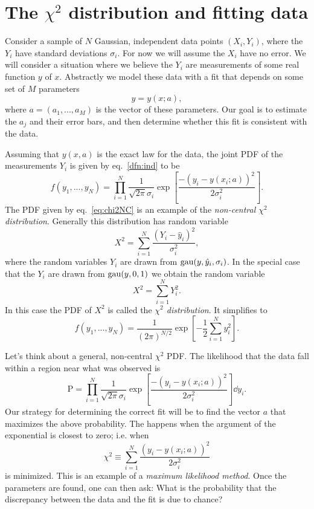 \section{The $\chi^2$ distribution and fitting data}
Consider a sample of $N$ Gaussian, independent data points $(X_i,Y_i)$,
where the $Y_i$ have standard deviations $\sigma_i$. For now we will
assume the $X_i$ have no error. We will consider a situation where
we believe the $Y_i$ are measurements of some real function $y$ of $x$.
Abstractly we model these data with a fit that depends on some set
of $M$ parameters
\begin{equation}
  y=y(x;a),
\end{equation}
where $a=(a_1,...,a_M)$ is the vector of these parameters. Our goal
is to estimate the $a_j$ and their error bars, and then determine whether
this fit is consistent with the data.

Assuming that $y(x,a)$ is the exact law for the data, the joint PDF
of the measurements $Y_i$ is given by eq.~\eqref{dfn:ind} to be
\begin{equation}\label{eq:chi2NC}
  f(y_1,...,y_N)=\prod_{i=1}^N\frac{1}{\sqrt{2\pi}\sigma_i}
      \exp\left[\frac{-(y_i-y(x_i;a))^2}{2\sigma_i^2}\right].
\end{equation}
The PDF given by eq.~\eqref{eq:chi2NC} is an example of the 
{\it non-central $\chi^2$ distribution}. Generally this distribution
has random variable
\begin{equation}
  X^2=\sum_{i=1}^N\frac{(Y_i-\hat{y}_i)^2}{\sigma_i^2},
\end{equation}
where the random variables $Y_i$ are drawn from $\operatorname{gau}(y,\hat{y}_i,\sigma_i)$. 
In the special case that the $Y_i$ are drawn from $\operatorname{gau}(y,0,1)$ we
obtain the random variable
\begin{equation}
  X^2=\sum\limits_{i=1}^NY_i^2.
\end{equation}
In this case the PDF of $X^2$ is called the {\it $\chi^2$ distribution}. 
 It simplifies to 
\begin{equation}\label{eq:chi2dist}
  f(y_1,...,y_N)=\frac{1}{(2\pi)^{N/2}}
      \exp\left[-\frac{1}{2}\sum_{i=1}^Ny_i^2\right].
\end{equation}

Let's think about a general, non-central $\chi^2$ PDF. The likelihood that the
data fall within a region near what was observed is 
\begin{equation}
  \text{P}=\prod_{i=1}^N\frac{1}{\sqrt{2\pi}\sigma_i}
      \exp\left[\frac{-(y_i-y(x_i;a))^2}{2\sigma_i^2}\right]\dd{y_i}.
\end{equation}
Our strategy for determining the correct fit will be to find the vector $a$
that maximizes the above probability. The happens when the argument
of the exponential is closest to zero; i.e. when
\begin{equation}
  \chi^2\equiv\sum_{i=1}^N\frac{(y_i-y(x_i;a))^2}{2\sigma_i^2}
\end{equation}
is minimized. This is an example of a {\it maximum likelihood method}.
Once the parameters are found, one can then ask: What is the probability
that the discrepancy between the data and the fit is due to chance? 


